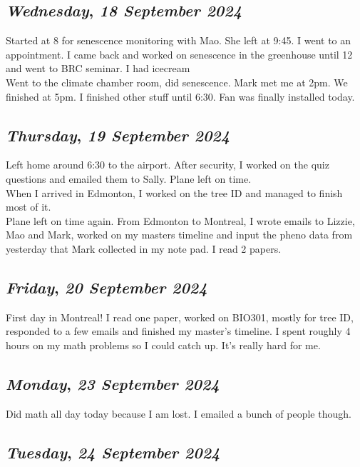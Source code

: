 \def\day{\textit{18 September 2024}}
\def\weekday{\textit{Wednesday}}
\subsection*{\weekday, \day}
Started at 8 for senescence monitoring with Mao. She left at 9:45. I went to an appointment. I came back and worked on senescence in the greenhouse until 12 and went to BRC seminar. I had icecream\\
Went to the climate chamber room, did senescence. Mark met me at 2pm. We finished at 5pm. I finished other stuff until 6:30. Fan was finally installed today. 

\def\day{\textit{19 September 2024}}
\def\weekday{\textit{Thursday}}
\subsection*{\weekday, \day}
Left home around 6:30 to the airport. After security, I worked on the quiz questions and emailed them to Sally. Plane left on time. \\
When I arrived in Edmonton, I worked on the tree ID and managed to finish most of it.\\
Plane left on time again. From Edmonton to Montreal, I wrote emails to Lizzie, Mao and Mark, worked on my masters timeline and input the pheno data from yesterday that Mark collected in my note pad. I read 2 papers. 

\def\day{\textit{20 September 2024}}
\def\weekday{\textit{Friday}}
\subsection*{\weekday, \day}
First day in Montreal! I read one paper, worked on BIO301, mostly for tree ID, responded to a few emails and finished my master's timeline. I spent roughly 4 hours on my math problems so I could catch up. It's really hard for me. 

\def\day{\textit{23 September 2024}}
\def\weekday{\textit{Monday}}
\subsection*{\weekday, \day}
Did math all day today because I am lost. I emailed a bunch of people though.  

\def\day{\textit{24 September 2024}}
\def\weekday{\textit{Tuesday}}
\subsection*{\weekday, \day}


